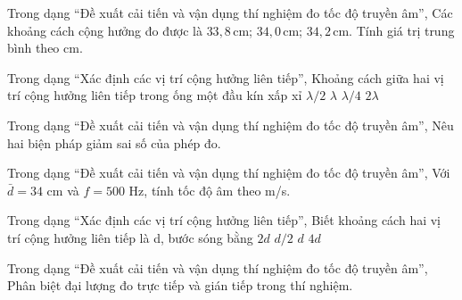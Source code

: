 \begin{ex}
Trong dạng “Đề xuất cải tiến và vận dụng thí nghiệm đo tốc độ truyền âm”, Các khoảng cách cộng hưởng đo được là $33,8\,\text{cm}$; $34,0\,\text{cm}$; $34,2\,\text{cm}$. Tính giá trị trung bình theo cm.
\end{ex}

\begin{ex}
Trong dạng “Xác định các vị trí cộng hưởng liên tiếp”, Khoảng cách giữa hai vị trí cộng hưởng liên tiếp trong ống một đầu kín xấp xỉ
\choice
{\True $\lambda/2$}
{$\lambda$}
{$\lambda/4$}
{$2\lambda$}
\end{ex}

\begin{ex}
Trong dạng “Đề xuất cải tiến và vận dụng thí nghiệm đo tốc độ truyền âm”, Nêu hai biện pháp giảm sai số của phép đo.
\choiceTF

\end{ex}

\begin{ex}
Trong dạng “Đề xuất cải tiến và vận dụng thí nghiệm đo tốc độ truyền âm”, Với $\bar d=34$ cm và $f=500$ Hz, tính tốc độ âm theo m/s.
\end{ex}

\begin{ex}
Trong dạng “Xác định các vị trí cộng hưởng liên tiếp”, Biết khoảng cách hai vị trí cộng hưởng liên tiếp là d, bước sóng bằng
\choice
{\True $2d$}
{$d/2$}
{$d$}
{$4d$}
\end{ex}

\begin{ex}
Trong dạng “Đề xuất cải tiến và vận dụng thí nghiệm đo tốc độ truyền âm”, Phân biệt đại lượng đo trực tiếp và gián tiếp trong thí nghiệm.
\choiceTF

\end{ex}

